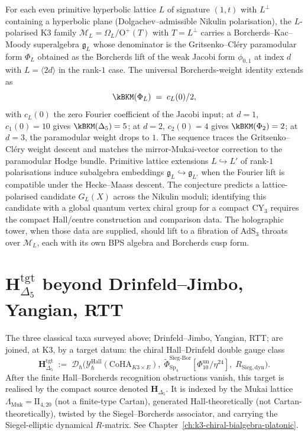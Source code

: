 \begin{conjecture}
\label{conj:lattice-polarised-G-X}
For each even primitive hyperbolic lattice $L$ of signature $(1, t)$ with $L^\perp$ containing a hyperbolic plane (Dolgachev--admissible Nikulin polarisation), the $L$-polarised K3 family $\mathcal{M}_L = \Omega_L / \mathrm{O}^+(T)$ with $T = L^\perp$ carries a Borcherds--Kac--Moody superalgebra $\mathfrak{g}_L$ whose denominator is the Gritsenko--Cl\'ery paramodular form $\Phi_L$ obtained as the Borcherds lift of the weak Jacobi form $\phi_{0, 1}$ at index $d$ with $L = \langle 2d \rangle$ in the rank-$1$ case. The universal Borcherds-weight identity extends as
\[
 \kBKM(\Phi_L) \;=\; c_L(0)/2,
\]
with $c_L(0)$ the zero Fourier coefficient of the Jacobi input; at $d = 1$, $c_1(0) = 10$ gives $\kBKM(\Delta_5) = 5$; at $d = 2$, $c_2(0) = 4$ gives $\kBKM(\Phi_2) = 2$; at $d = 3$, the paramodular weight drops to $1$. The sequence traces the Gritsenko--Cl\'ery weight descent and matches the mirror-Mukai-vector correction to the paramodular Hodge bundle. Primitive lattice extensions $L \hookrightarrow L'$ of rank-$1$ polarisations induce subalgebra embeddings $\mathfrak{g}_L \hookrightarrow \mathfrak{g}_{L'}$ when the Fourier lift is compatible under the Hecke--Maass descent. The conjecture predicts a lattice-polarised candidate \(G_L(X)\) across the Nikulin moduli; identifying this candidate with a global quantum vertex chiral group for a compact CY$_3$ requires the compact Hall/centre construction and comparison data. The holographic tower, when those data are supplied, should lift to a fibration of AdS$_3$ throats over $\mathcal{M}_L$, each with its own BPS algebra and Borcherds cusp form.
\end{conjecture}

\section{\texorpdfstring{$\mathbf H_{\Delta_5}^{\mathrm{tgt}}$}{H-Delta-5 target} beyond Drinfeld--Jimbo, Yangian, RTT}
\label{sec:qgfnd-fourth-taxon}

\begin{remark}
\label{rem:qgfnd-fourth-taxon}
The three classical taxa surveyed above; Drinfeld--Jimbo,
Yangian, RTT; are joined, at K3, by a target datum: the chiral
Hall--Drinfeld double gauge class
\[
\mathbf H_{\Delta_5}^{\mathrm{tgt}}
\;:=\; \mathcal D_\hbar\bigl(\mathcal Y^{\mathrm{Hall}}_\hbar(\mathrm{CoHA}_{K3\times E}),\; \widetilde\Phi^{\mathrm{Sieg\text{-}Bor}}_{\mathrm{Sp}_4}[\Phi_{10}^{\mathrm{un}}/\eta^{24}],\; R_{\mathrm{Sieg,dyn}}\bigr).
\]
After the finite Hall--Borcherds recognition obstructions vanish, this target is
realised by the compact source denoted $\mathbf H_{\Delta_5}$. It is
indexed by the Mukai lattice $\Lambda_{\mathrm{Muk}} = \mathrm{II}_{4,20}$
(not a finite-type Cartan), generated Hall-theoretically (not
Cartan-theoretically), twisted by the Siegel--Borcherds associator,
and carrying the Siegel-elliptic dynamical $R$-matrix. See
Chapter~\ref{ch:k3-chiral-bialgebra-platonic}.
\end{remark}

